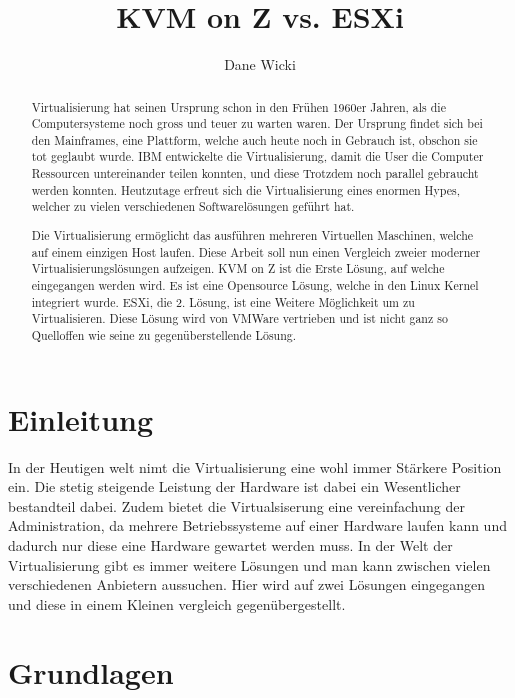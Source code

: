 \documentclass[14pt]{extreport}
\author{Dane Wicki}
\title{KVM on Z vs. ESXi}
\begin{document}
\maketitle

\begin{abstract}
Virtualisierung hat seinen Ursprung schon in den Frühen 1960er Jahren, als die Computersysteme noch gross und teuer zu warten waren. Der Ursprung findet sich bei den Mainframes, eine Plattform, welche auch heute noch in Gebrauch ist, obschon sie tot geglaubt wurde. IBM entwickelte die Virtualisierung, damit die User die Computer Ressourcen untereinander teilen konnten, und diese Trotzdem noch parallel gebraucht werden konnten. Heutzutage erfreut sich die Virtualisierung eines enormen Hypes, welcher zu vielen verschiedenen Softwarelösungen geführt hat.

Die Virtualisierung ermöglicht das ausführen mehreren Virtuellen Maschinen, welche auf einem einzigen Host laufen. Diese Arbeit soll nun einen Vergleich zweier moderner Virtualisierungslösungen aufzeigen. KVM on Z ist die Erste Lösung, auf welche eingegangen werden wird. Es ist eine Opensource Lösung, welche in den Linux Kernel integriert wurde. 
ESXi, die 2. Lösung, ist eine Weitere Möglichkeit um zu Virtualisieren. Diese Lösung wird von VMWare vertrieben und ist nicht ganz so Quelloffen wie seine zu gegenüberstellende Lösung.

\end{abstract}

\tableofcontents

\chapter{Einleitung}
In der Heutigen welt nimt die Virtualisierung eine wohl immer Stärkere Position ein. Die stetig steigende Leistung der Hardware ist dabei ein Wesentlicher bestandteil dabei. Zudem bietet die Virtualsiserung eine vereinfachung der Administration, da mehrere Betriebssysteme auf einer Hardware laufen kann und dadurch nur diese eine Hardware gewartet werden muss. In der Welt der Virtualisierung gibt es immer weitere Lösungen und man kann zwischen vielen verschiedenen Anbietern aussuchen. Hier wird auf zwei Lösungen eingegangen und diese in einem Kleinen vergleich gegenübergestellt.

\chapter{Grundlagen}
\end{document}

